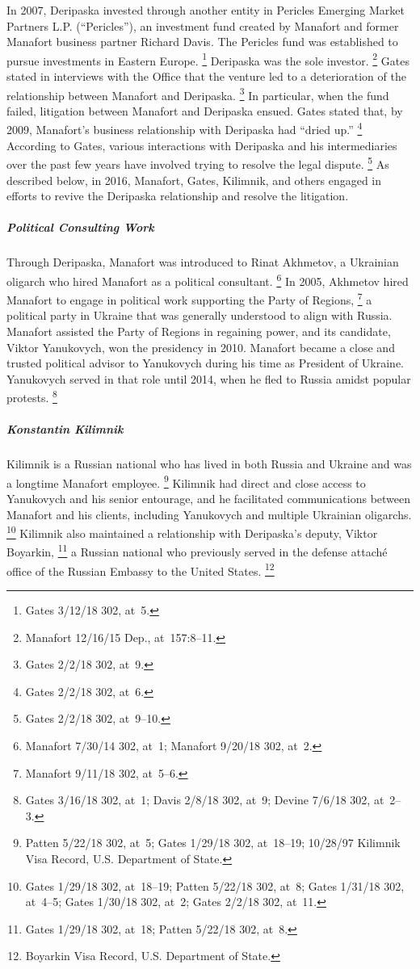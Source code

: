In 2007, Deripaska invested through another entity in Pericles Emerging Market Partners L.P. (``Pericles''), an investment fund created by Manafort and former Manafort business partner Richard Davis.
The Pericles fund was established to pursue investments in Eastern Europe.%
\footnote{Gates 3/12/18 302, at~5.}
Deripaska was the sole investor.%
\footnote{Manafort 12/16/15 Dep., at~157:8--11.}
Gates stated in interviews with the Office that the venture led to a deterioration of the relationship between Manafort and Deripaska.%
\footnote{Gates 2/2/18 302, at~9.}
In particular, when the fund failed, litigation between Manafort and Deripaska ensued.
Gates stated that, by 2009, Manafort's business relationship with Deripaska had ``dried up.''%
\footnote{Gates 2/2/18 302, at~6.}
According to Gates, various interactions with Deripaska and his intermediaries over the past few years have involved trying to resolve the legal dispute.%
\footnote{Gates 2/2/18 302, at~9--10.}
As described below, in 2016, Manafort, Gates, Kilimnik, and others engaged in efforts to revive the Deripaska relationship and resolve the litigation.

\subparagraph{Political Consulting Work}

Through Deripaska, Manafort was introduced to Rinat Akhmetov, a Ukrainian oligarch who hired Manafort as a political consultant.%
\footnote{Manafort 7/30/14 302, at~1;
Manafort 9/20/18 302, at~2.}
In 2005, Akhmetov hired Manafort to engage in political work supporting the Party of Regions,%
\footnote{Manafort 9/11/18 302, at~5--6.}
a political party in Ukraine that was generally understood to align with Russia.
Manafort assisted the Party of Regions in regaining power, and its candidate, Viktor Yanukovych, won the presidency in 2010.
Manafort became a close and trusted political advisor to Yanukovych during his time as President of Ukraine.
Yanukovych served in that role until 2014, when he fled to Russia amidst popular protests.%
\footnote{Gates 3/16/18 302, at~1;
Davis 2/8/18 302, at~9;
Devine 7/6/18 302, at~2--3.}

\subparagraph{Konstantin Kilimnik}

Kilimnik is a Russian national who has lived in both Russia and Ukraine and was a longtime Manafort employee.%
\footnote{Patten 5/22/18 302, at~5;
Gates 1/29/18 302, at~18--19;
10/28/97 Kilimnik Visa Record, U.S. Department of State.}
Kilimnik had direct and close access to Yanukovych and his senior entourage, and he facilitated communications between Manafort and his clients, including Yanukovych and multiple Ukrainian oligarchs.%
\footnote{Gates 1/29/18 302, at~18--19;
Patten 5/22/18 302, at~8;
Gates 1/31/18 302, at~4--5;
Gates 1/30/18 302, at~2;
Gates 2/2/18 302, at~11.}
Kilimnik also maintained a relationship with Deripaska's deputy, Viktor Boyarkin,%
\footnote{Gates 1/29/18 302, at~18;
Patten 5/22/18 302, at~8.}
a Russian national who previously served in the defense attaché office of the Russian Embassy to the United States.%
\footnote{Boyarkin Visa Record, U.S. Department of State.}

